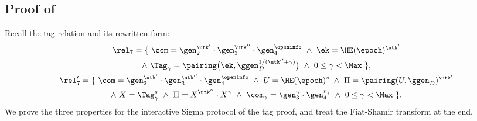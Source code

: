 \subsection{Proof of }\label{sec:rel7-equiv}

Recall the tag relation and its rewritten form:
%
\begin{equation*} \begin{gathered}
  \rel_7 = \{\ \com = \gen_2^{\utk'}\cdot\gen_3^{\utk''}\cdot\gen_4^{\openinfo}
\ \wedge \ \ek = \HE(\epoch)^{\utk'} \\ \wedge \ \Tag_\gamma =
\pairing\big(\ek,\ggen_D^{1/(\utk''+\gamma)}\big) \ \wedge \ 0 \leq \gamma <
\Max\ \}, \\
  \rel_7' = \{\ \com = \gen_2^{\utk'}\cdot\gen_3^{\utk''}\cdot\gen_4^{\openinfo}
\ \wedge \ U = \HE(\epoch)^s \ \wedge \ \Pi = \pairing(U,\ggen_D)^{\utk'} \\
\wedge \ X = \Tag_\gamma^s \ \wedge \ \Pi = X^{\utk''}\cdot X^{\gamma} \ \wedge
\ \com_\gamma = \gen_3^{\gamma}\cdot\gen_4^{r_\gamma} \ \wedge \ 0 \leq \gamma <
\Max\ \}.
\end{gathered} \end{equation*}
%
We prove the three properties for the interactive Sigma protocol of the tag
proof, and treat the Fiat-Shamir transform at the end.

